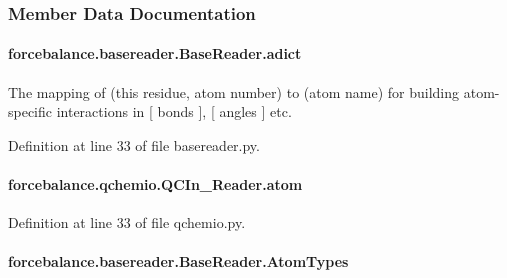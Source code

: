 \subsubsection{Member Data Documentation}
\hypertarget{classforcebalance_1_1basereader_1_1BaseReader_a84a513e0e43145b2fdaf38e73c32f83a}{
\paragraph[{adict}]{\setlength{\rightskip}{0pt plus 5cm}forcebalance.\-basereader.\-Base\-Reader.\-adict\hspace{0.3cm}{\ttfamily [inherited]}}}\label{classforcebalance_1_1basereader_1_1BaseReader_a84a513e0e43145b2fdaf38e73c32f83a}


The mapping of (this residue, atom number) to (atom name) for building atom-\/specific interactions in \mbox{[} bonds \mbox{]}, \mbox{[} angles \mbox{]} etc. 



Definition at line 33 of file basereader.\-py.

\hypertarget{classforcebalance_1_1qchemio_1_1QCIn__Reader_a292faa93e52c57c63d3c34d1bb9d5012}{
\paragraph[{atom}]{\setlength{\rightskip}{0pt plus 5cm}forcebalance.\-qchemio.\-Q\-C\-In\-\_\-\-Reader.\-atom}}\label{classforcebalance_1_1qchemio_1_1QCIn__Reader_a292faa93e52c57c63d3c34d1bb9d5012}


Definition at line 33 of file qchemio.\-py.

\hypertarget{classforcebalance_1_1basereader_1_1BaseReader_ad5765e192499937376950410364014af}{
\paragraph[{Atom\-Types}]{\setlength{\rightskip}{0pt plus 5cm}forcebalance.\-basereader.\-Base\-Reader.\-Atom\-Types\hspace{0.3cm}{\ttfamily [inherited]}}}\label{classforcebalance_1_1basereader_1_1BaseReader_ad5765e192499937376950410364014af}


